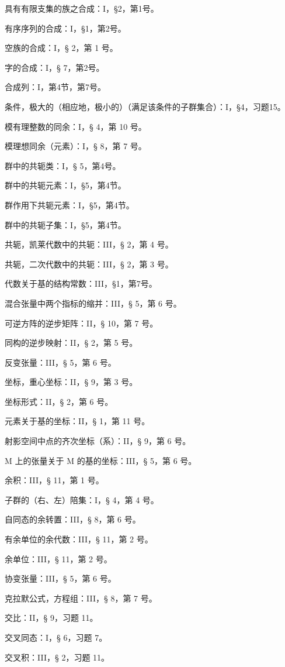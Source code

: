 具有有限支集的族之合成：I，§2，第1号。

有序序列的合成：I，§1，第2号。

空族的合成：I，§ 2，第 1 号。

字的合成：I，§ 7，第2号。

合成列：I，第4节，第7号。

条件，极大的（相应地，极小的）（满足该条件的子群集合）：I，§4，习题15。

模有理整数的同余：I，§ 4，第 10 号。

模理想同余（元素）：I，§ 8，第 7 号。

群中的共轭类：I，§ 5，第4号。

群中的共轭元素：I，§5，第4节。

群作用下共轭元素：I，§5，第4节。

群中的共轭子集：I，§5，第4节。

共轭，凯莱代数中的共轭：III，§ 2，第 4 号。

共轭，二次代数中的共轭：III，§ 2，第 3 号。

代数关于基的结构常数：III，§1，第7号。

混合张量中两个指标的缩并：III，§ 5，第 6 号。

可逆方阵的逆步矩阵：II，§ 10，第 7 号。

同构的逆步映射：II，§ 2，第 5 号。

反变张量：III，§ 5，第 6 号。

坐标，重心坐标：II，§ 9，第 3 号。

坐标形式：II，§ 2，第 6 号。

元素关于基的坐标：II，§ 1，第 11 号。

射影空间中点的齐次坐标（系）：II，§ 9，第 6 号。

M 上的张量关于 M 的基的坐标：III，§ 5，第 6 号。

余积：III，§ 11，第 1 号。

子群的（右、左）陪集：I，§ 4，第 4 号。

自同态的余转置：III，§ 8，第 6 号。

有余单位的余代数：III，§ 11，第 2 号。

余单位：III，§ 11，第 2 号。

协变张量：III，§ 5，第 6 号。

克拉默公式，方程组：III，§ 8，第 7 号。

交比：II，§ 9，习题 11。

交叉同态：I，§ 6，习题 7。

交叉积：III，§ 2，习题 11。

